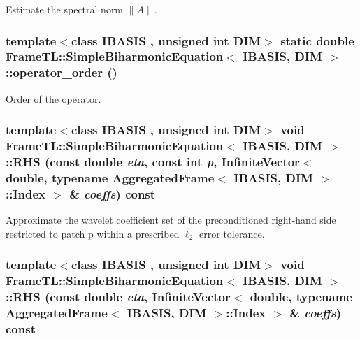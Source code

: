 Estimate the spectral norm $\|A\|$. \hypertarget{classFrameTL_1_1SimpleBiharmonicEquation_f0bb15f82dc56ef8739a37af36d52cb0}{
\subsubsection[{operator\_\-order}]{\setlength{\rightskip}{0pt plus 5cm}template$<$class IBASIS , unsigned int DIM$>$ static double {\bf FrameTL::SimpleBiharmonicEquation}$<$ IBASIS, DIM $>$::operator\_\-order ()}}
\label{classFrameTL_1_1SimpleBiharmonicEquation_f0bb15f82dc56ef8739a37af36d52cb0}


Order of the operator. \hypertarget{classFrameTL_1_1SimpleBiharmonicEquation_c3e82086527e9d3306dcabb21ccdda3a}{
\subsubsection[{RHS}]{\setlength{\rightskip}{0pt plus 5cm}template$<$class IBASIS , unsigned int DIM$>$ void {\bf FrameTL::SimpleBiharmonicEquation}$<$ IBASIS, DIM $>$::RHS (const double {\em eta}, \/  const int {\em p}, \/  InfiniteVector$<$ double, typename {\bf AggregatedFrame}$<$ IBASIS, DIM $>$::{\bf Index} $>$ \& {\em coeffs}) const}}
\label{classFrameTL_1_1SimpleBiharmonicEquation_c3e82086527e9d3306dcabb21ccdda3a}


Approximate the wavelet coefficient set of the preconditioned right-hand side restricted to patch p within a prescribed $\ell_2$ error tolerance. \hypertarget{classFrameTL_1_1SimpleBiharmonicEquation_1933d37148f59cd1eb3c4b2dcbee396f}{
\subsubsection[{RHS}]{\setlength{\rightskip}{0pt plus 5cm}template$<$class IBASIS , unsigned int DIM$>$ void {\bf FrameTL::SimpleBiharmonicEquation}$<$ IBASIS, DIM $>$::RHS (const double {\em eta}, \/  InfiniteVector$<$ double, typename {\bf AggregatedFrame}$<$ IBASIS, DIM $>$::{\bf Index} $>$ \& {\em coeffs}) const}}
\label{classFrameTL_1_1SimpleBiharmonicEquation_1933d37148f59cd1eb3c4b2dcbee396f}


